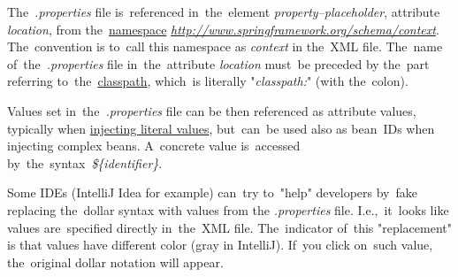 The~\textit{.properties} file is~referenced in~the~element \textit{property--placeholder}, attribute \textit{location}, from the~\hyperref[namespaces]{namespace} \textit{\href{http://www.springframework.org/schema/context}{http://www.springframework.org/schema/context}}. The~convention is to~call this namespace as \textit{context} in the~XML file. The~name of~the~\textit{.properties} file in~the~attribute \textit{location} must~be preceded by the~part referring to~the~\hyperref[classpath]{classpath}, which~is literally "\textit{classpath:}" (with the~colon).

Values set in~the~\textit{.properties} file can be then referenced as attribute values, typically when \hyperref[injectingliteralvalues]{injecting literal values}, but~can~be used also as bean~IDs when injecting complex beans. A~concrete value is~accessed by~the~syntax~\textit{\$\{identifier\}}.

\warning Some IDEs (IntelliJ Idea for example) can~try to~"help" developers by~fake replacing the~dollar syntax with values from the \textit{.properties} file. I.e.,~it~looks like values are~specified directly in~the~XML file. The~indicator of~this "replacement" is that values have different color (gray in IntelliJ). If~you click on~such value, the~original dollar notation will appear.\\

